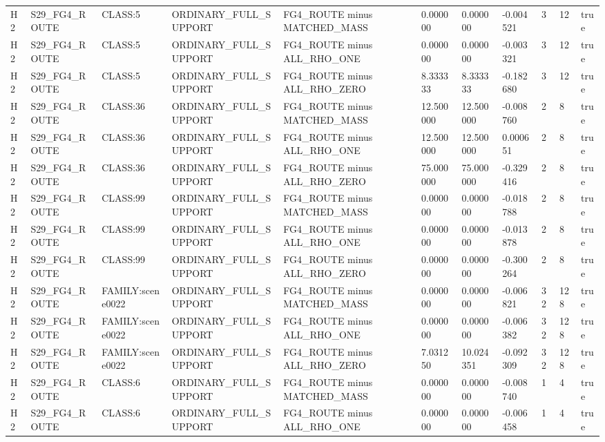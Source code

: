 \begin{tabular}{lllllllllll}
H2 & S29\_FG4\_ROUTE & CLASS:5 & ORDINARY\_FULL\_SUPPORT & FG4\_ROUTE minus MATCHED\_MASS & 0.000000 & 0.000000 & -0.004521 & 3 & 12 & true \\
H2 & S29\_FG4\_ROUTE & CLASS:5 & ORDINARY\_FULL\_SUPPORT & FG4\_ROUTE minus ALL\_RHO\_ONE & 0.000000 & 0.000000 & -0.003321 & 3 & 12 & true \\
H2 & S29\_FG4\_ROUTE & CLASS:5 & ORDINARY\_FULL\_SUPPORT & FG4\_ROUTE minus ALL\_RHO\_ZERO & 8.333333 & 8.333333 & -0.182680 & 3 & 12 & true \\
H2 & S29\_FG4\_ROUTE & CLASS:36 & ORDINARY\_FULL\_SUPPORT & FG4\_ROUTE minus MATCHED\_MASS & 12.500000 & 12.500000 & -0.008760 & 2 & 8 & true \\
H2 & S29\_FG4\_ROUTE & CLASS:36 & ORDINARY\_FULL\_SUPPORT & FG4\_ROUTE minus ALL\_RHO\_ONE & 12.500000 & 12.500000 & 0.000651 & 2 & 8 & true \\
H2 & S29\_FG4\_ROUTE & CLASS:36 & ORDINARY\_FULL\_SUPPORT & FG4\_ROUTE minus ALL\_RHO\_ZERO & 75.000000 & 75.000000 & -0.329416 & 2 & 8 & true \\
H2 & S29\_FG4\_ROUTE & CLASS:99 & ORDINARY\_FULL\_SUPPORT & FG4\_ROUTE minus MATCHED\_MASS & 0.000000 & 0.000000 & -0.018788 & 2 & 8 & true \\
H2 & S29\_FG4\_ROUTE & CLASS:99 & ORDINARY\_FULL\_SUPPORT & FG4\_ROUTE minus ALL\_RHO\_ONE & 0.000000 & 0.000000 & -0.013878 & 2 & 8 & true \\
H2 & S29\_FG4\_ROUTE & CLASS:99 & ORDINARY\_FULL\_SUPPORT & FG4\_ROUTE minus ALL\_RHO\_ZERO & 0.000000 & 0.000000 & -0.300264 & 2 & 8 & true \\
H2 & S29\_FG4\_ROUTE & FAMILY:scene0022 & ORDINARY\_FULL\_SUPPORT & FG4\_ROUTE minus MATCHED\_MASS & 0.000000 & 0.000000 & -0.006821 & 32 & 128 & true \\
H2 & S29\_FG4\_ROUTE & FAMILY:scene0022 & ORDINARY\_FULL\_SUPPORT & FG4\_ROUTE minus ALL\_RHO\_ONE & 0.000000 & 0.000000 & -0.006382 & 32 & 128 & true \\
H2 & S29\_FG4\_ROUTE & FAMILY:scene0022 & ORDINARY\_FULL\_SUPPORT & FG4\_ROUTE minus ALL\_RHO\_ZERO & 7.031250 & 10.024351 & -0.092309 & 32 & 128 & true \\
H2 & S29\_FG4\_ROUTE & CLASS:6 & ORDINARY\_FULL\_SUPPORT & FG4\_ROUTE minus MATCHED\_MASS & 0.000000 & 0.000000 & -0.008740 & 1 & 4 & true \\
H2 & S29\_FG4\_ROUTE & CLASS:6 & ORDINARY\_FULL\_SUPPORT & FG4\_ROUTE minus ALL\_RHO\_ONE & 0.000000 & 0.000000 & -0.006458 & 1 & 4 & true \\

\end{tabular}
